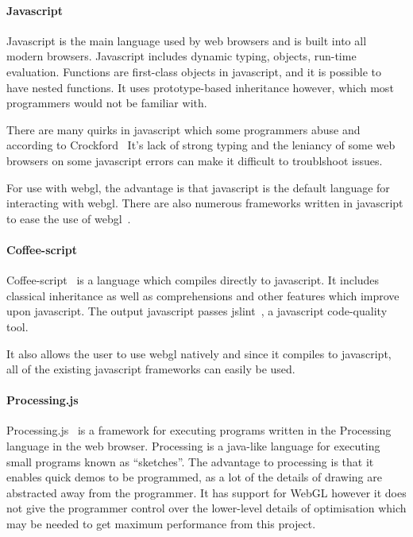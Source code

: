 \documentclass[12pt]{article}
\begin{document}
\paragraph{Javascript}
Javascript is the main language used by web browsers and is built into all modern browsers.
Javascript includes dynamic typing, objects, run-time evaluation.
Functions are first-class objects in javascript, and it is possible to have nested functions.
It uses prototype-based inheritance however, which most programmers would not be familiar with.

There are many quirks in javascript which some programmers abuse and according to Crockford~\cite{web:javascriptbadparts}
It's lack of strong typing and the leniancy of some web browsers on some javascript errors can make it difficult to troublshoot issues.

For use with webgl, the advantage is that javascript is the default language for interacting with webgl.
There are also numerous frameworks written in javascript to ease the use of webgl~\cite{web:threejs}\cite{web:copperlicht}. 

\paragraph{Coffee-script}
Coffee-script~\cite{web:coffeescript} is a language which compiles directly to javascript.
It includes classical inheritance as well as comprehensions and other features which improve upon javascript.
The output javascript passes jslint~\cite{web:jslint}, a javascript code-quality tool.

It also allows the user to use webgl natively and since it compiles to javascript, all of the existing javascript frameworks can easily be used.

\paragraph{Processing.js}
Processing.js~\cite{web:processingjs} is a framework for executing programs written in the Processing~\cite{web:processing} language in the web browser.
Processing is a java-like language for executing small programs known as ``sketches''.
The advantage to processing is that it enables quick demos to be programmed, as a lot of the details of drawing are abstracted away from the programmer.
It has support for WebGL however it does not give the programmer control over the lower-level details of optimisation which may be needed to get maximum performance from this project.
\end{document}
